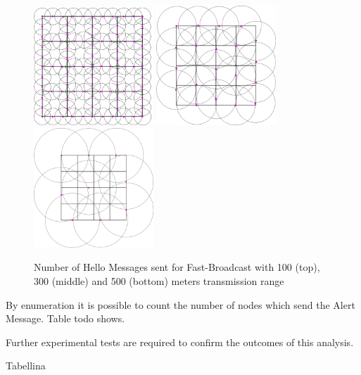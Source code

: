 		\begin{figure}[H]
			\centering
			\includegraphics[width=0.4\textwidth]{immagini/hello-100}
			\includegraphics[width=0.4\textwidth]{immagini/hello-300}
			\includegraphics[width=0.4\textwidth]{immagini/hello-500}
			\caption{Number of Hello Messages sent for Fast-Broadcast with 100 (top), 300 (middle) and 500 (bottom) meters transmission range}
			\label{fig:hello-fb}
		\end{figure}
		
		By enumeration it is possible to count the number of nodes which send the Alert Message. Table todo shows.
		
		
		Further experimental tests are required to confirm the outcomes of this analysis.
		
		
		Tabellina
		
		
		
		
		
	
	

	